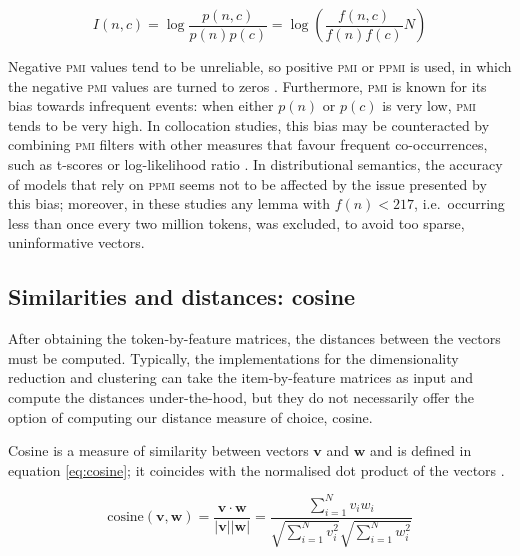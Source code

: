 \documentclass[
]{book}
\begin{document}
\begin{equation}
  I(n, c) = \log \frac{p(n,c)}{p(n)p(c)} = \log \left( \frac{f(n,c)}{f(n)f(c)} N \right)
  \label{eq:pmi}
\end{equation}

Negative \textsc{pmi} values tend to be unreliable, so positive \textsc{pmi} or \textsc{ppmi} is used, in which the negative \textsc{pmi} values are turned to zeros \autocites[109]{bullinaria.levy_2007,kiela.clark_2014,depascale_2019,jurafsky.martin_2020}.
Furthermore, \textsc{pmi} is known for its bias towards infrequent events: when either \(p(n)\) or \(p(c)\) is very low, \textsc{pmi} tends to be very high. In collocation studies, this bias may be counteracted by combining \textsc{pmi} filters with other measures that favour frequent co-occurrences, such as t-scores or log-likelihood ratio \autocite{mcenery.etal_2010}. In distributional semantics, the accuracy of models that rely on \textsc{ppmi} seems not to be affected by the issue presented by this bias;
moreover, in these studies any lemma with \(f(n) < 217\), i.e.~occurring less than once every two million tokens, was excluded, to avoid too sparse, uninformative vectors.

\hypertarget{cosine}{%
\subsection{Similarities and distances: cosine}\label{cosine}}

After obtaining the token-by-feature matrices, the distances between the vectors must be computed. Typically, the implementations for the dimensionality reduction and clustering can take the item-by-feature matrices as input and compute the distances under-the-hood, but they do not necessarily offer the option of computing our distance measure of choice, cosine.

Cosine is a measure of similarity between vectors \(\mathbf{v}\) and \(\mathbf{w}\) and is defined in equation \eqref{eq:cosine}; it coincides with the normalised dot product of the vectors \autocite[105]{jurafsky.martin_2020}.

\begin{equation}
  \mathrm{cosine}(\mathbf{v}, \mathbf{w}) = \frac{\mathbf{v} \cdot \mathbf{w}}{\left|\mathbf{v}\right|\left|\mathbf{w}\right|} = \frac{\sum\limits_{i=1}^N v_iw_i}{\sqrt{\sum\limits_{i=1}^N v_i^2}\sqrt{\sum\limits_{i=1}^N w_i^2}}
  \label{eq:cosine}
\end{equation}
\end{document}
